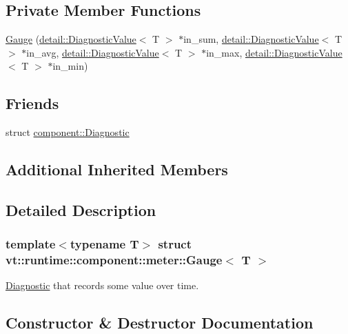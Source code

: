 \subsection*{Private Member Functions}
\begin{DoxyCompactItemize}
\item 
\hyperlink{structvt_1_1runtime_1_1component_1_1meter_1_1_gauge_ad698621de4f0e95e66190c016684aafe}{Gauge} (\hyperlink{structvt_1_1runtime_1_1component_1_1detail_1_1_diagnostic_value}{detail\+::\+Diagnostic\+Value}$<$ T $>$ $\ast$in\+\_\+sum, \hyperlink{structvt_1_1runtime_1_1component_1_1detail_1_1_diagnostic_value}{detail\+::\+Diagnostic\+Value}$<$ T $>$ $\ast$in\+\_\+avg, \hyperlink{structvt_1_1runtime_1_1component_1_1detail_1_1_diagnostic_value}{detail\+::\+Diagnostic\+Value}$<$ T $>$ $\ast$in\+\_\+max, \hyperlink{structvt_1_1runtime_1_1component_1_1detail_1_1_diagnostic_value}{detail\+::\+Diagnostic\+Value}$<$ T $>$ $\ast$in\+\_\+min)
\end{DoxyCompactItemize}
\subsection*{Friends}
\begin{DoxyCompactItemize}
\item 
struct \hyperlink{structvt_1_1runtime_1_1component_1_1meter_1_1_gauge_a48f263de9dbf26c1fc7736031cca9613}{component\+::\+Diagnostic}
\end{DoxyCompactItemize}
\subsection*{Additional Inherited Members}


\subsection{Detailed Description}
\subsubsection*{template$<$typename T$>$\newline
struct vt\+::runtime\+::component\+::meter\+::\+Gauge$<$ T $>$}

\hyperlink{structvt_1_1runtime_1_1component_1_1_diagnostic}{Diagnostic} that records some value over time. 

\subsection{Constructor \& Destructor Documentation}
\mbox{\label{structvt_1_1runtime_1_1component_1_1meter_1_1_gauge_a39b552111951ca991e92b7a3886e7d97}} 
